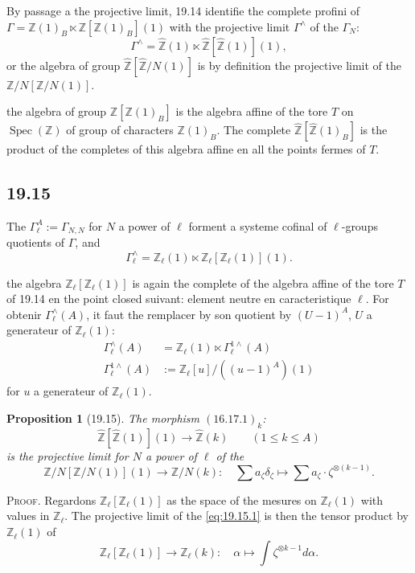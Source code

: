 \documentclass[12pt,a4paper]{article}
\theoremstyle{plain}
\newtheorem{proposition}[theorem]{Proposition}
\theoremstyle{definition}
\theoremstyle{remark}
\DeclareMathOperator{\Spec}{Spec}
\newcommand{\Betti}{B}
\newcommand{\ZZ}{\mathbb{Z}}
\begin{document}
By passage a the projective limit, 19.14 identifie the complete
profini of $\Gamma = \ZZ(1)_\Betti \ltimes \ZZ[\ZZ(1)_\Betti](1)$ with
the projective limit $\Gamma^\wedge$ of the $\Gamma_N$:
\[
\Gamma^\wedge = \hat{\ZZ}(1) \ltimes \hat{\ZZ}[\hat{\ZZ}(1)](1),
\]
or the algebra of group $\hat{\ZZ}[\hat{\ZZ}/N(1)]$ is by definition the
projective limit of the $\ZZ/N[\ZZ/N(1)]$.

the algebra of group $\ZZ[\ZZ(1)_\Betti]$ is the algebra affine of the tore
$T$ on $\Spec(\ZZ)$ of group of characters $\ZZ(1)_\Betti$. The
complete $\hat{\ZZ}[\hat{\ZZ}(1)_\Betti]$ is the product of the completes of
this algebra affine en all the points fermes of $T$.

\subsection{19.15}

The $\Gamma_\ell^A := \Gamma_{N,N}$ for $N$ a power of $\ell$
forment a systeme cofinal of $\ell$-groups quotients of $\Gamma$, and
\[
\Gamma_\ell^\wedge = \ZZ_\ell(1) \ltimes \ZZ_\ell[\ZZ_\ell(1)](1).
\]

the algebra $\ZZ_\ell[\ZZ_\ell(1)]$ is again the complete of the algebra
affine of the tore $T$ of 19.14 en the point closed suivant: element neutre
en caracteristique $\ell$. For obtenir $\Gamma_\ell^\wedge(A)$, it
faut the remplacer by son quotient by $(U-1)^A$, $U$ a generateur of
$\ZZ_\ell(1)$:
\begin{align*}
\Gamma_\ell^\wedge(A) &= \ZZ_\ell(1) \ltimes \Gamma_\ell^{1\wedge}(A) \\
\Gamma_\ell^{1\wedge}(A) &:= \ZZ_\ell[u]/((u-1)^A)(1)
\end{align*}
for $u$ a generateur of $\ZZ_\ell(1)$.

\begin{proposition}[19.15]\label{prop:19.15}
The morphism $(16.17.1)_k$:
\[
\hat{\ZZ}[\hat{\ZZ}(1)](1) \to \hat{\ZZ}(k) \qquad (1 \leq k \leq A)
\]
is the projective limit for $N$ a power of $\ell$ of the
\begin{equation}\label{eq:19.15.1}
\ZZ/N[\ZZ/N(1)](1) \to \ZZ/N(k) : \quad \sum a_\zeta \delta_\zeta
\longmapsto \sum a_\zeta \cdot \zeta^{\otimes(k-1)}.
\end{equation}
\end{proposition}

\noindent \textsc{Proof.} Regardons $\ZZ_\ell[\ZZ_\ell(1)]$ as
the space of the mesures on $\ZZ_\ell(1)$ with values in $\ZZ_\ell$. The
projective limit of the \eqref{eq:19.15.1} is then the tensor product
by $\ZZ_\ell(1)$ of
\begin{equation}\label{eq:19.15.2}
\ZZ_\ell[\ZZ_\ell(1)] \to \ZZ_\ell(k) : \quad \alpha \longmapsto
\int \zeta^{\otimes k-1} d\alpha.
\end{equation}
\end{document}
